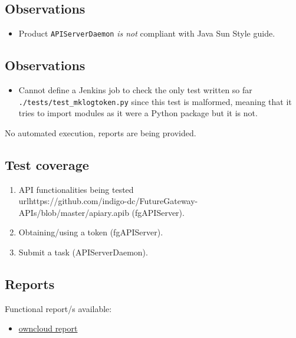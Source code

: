\documentclass[a4wide,11pt]{article}
\begin{document}
\subsection{Observations}
\begin{itemize}
        \item Product \texttt{APIServerDaemon} \textit{is not} compliant with Java Sun Style guide.
    \end{itemize}

 
 

\label{sec:unit_test}


\subsection{Observations}
\begin{itemize}
        \item Cannot define a Jenkins job to check the only test written so far \texttt{./tests/test\_mklogtoken.py} since this test is malformed, meaning that it tries to import modules as it were a Python package but it is not.
    \end{itemize}




\label{sec:func_int_test}

No automated execution, reports are being provided.

\subsection{Test coverage}
\begin{enumerate}
        \item API functionalities being tested \\url{https://github.com/indigo-dc/FutureGateway-APIs/blob/master/apiary.apib} (fgAPIServer).
        \item Obtaining/using a token (fgAPIServer).
        \item Submit a task (APIServerDaemon).
    \end{enumerate}

\subsection{Reports}
Functional report/s available:
\begin{itemize}
        \item \href{https://owncloud.indigo-datacloud.eu/index.php/apps/files/ajax/download.php?dir=%2FINDIGO-DC%20testing%20reports%2Ffunctional%2Findigo_1%2FFutureGateway&files=FutureGateway_functional_tests.docx}{owncloud report}
    \end{itemize}
\end{document}
